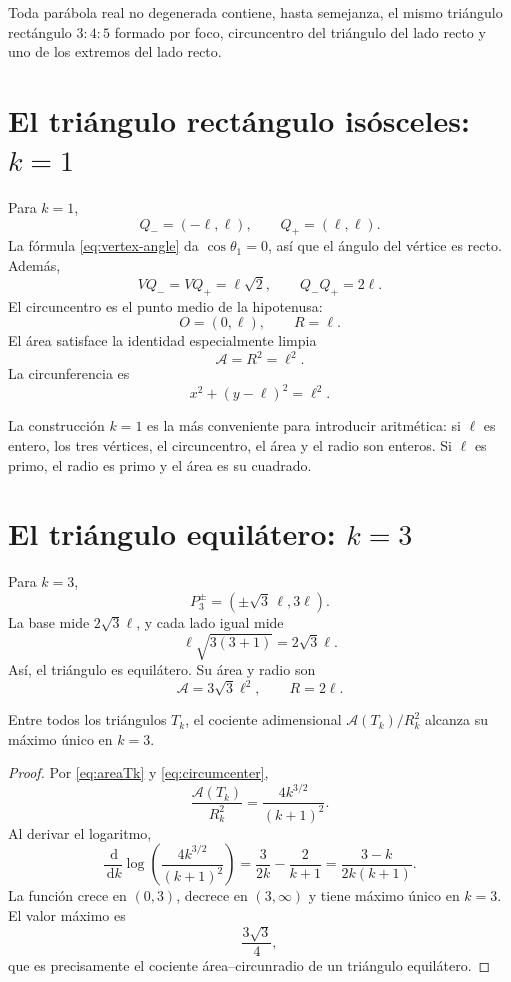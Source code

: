 \documentclass[11pt,a4paper,openany]{report}
\newcommand{\Area}{\mathcal{A}}
\newcommand{\dd}{\,\mathrm{d}}
\begin{document}
\begin{rigorousbox}
Toda parábola real no degenerada contiene, hasta semejanza, el mismo triángulo rectángulo \(3\!:\!4\!:\!5\) formado por foco, circuncentro del triángulo del lado recto y uno de los extremos del lado recto.
\end{rigorousbox}

\section{El triángulo rectángulo isósceles: \(k=1\)}

Para \(k=1\),
\[
 Q_-=(-\ell,\ell),\qquad Q_+=(\ell,\ell).
\]
La fórmula \eqref{eq:vertex-angle} da \(\cos\theta_1=0\), así que el ángulo del vértice es recto. Además,
\[
 VQ_-=VQ_+=\ell\sqrt2,
 \qquad Q_-Q_+=2\ell.
\]
El circuncentro es el punto medio de la hipotenusa:
\[
 O=(0,\ell),\qquad R=\ell.
\]
El área satisface la identidad especialmente limpia
\begin{equation}
 \boxed{\Area=R^2=\ell^2.}
 \label{eq:AequalsR2}
\end{equation}
La circunferencia es
\[
 x^2+(y-\ell)^2=\ell^2.
\]

\begin{insightbox}
La construcción \(k=1\) es la más conveniente para introducir aritmética: si \(\ell\) es entero, los tres vértices, el circuncentro, el área y el radio son enteros. Si \(\ell\) es primo, el radio es primo y el área es su cuadrado.
\end{insightbox}

\section{El triángulo equilátero: \(k=3\)}

Para \(k=3\),
\[
 P_3^\pm=(\pm\sqrt3\,\ell,3\ell).
\]
La base mide \(2\sqrt3\ell\), y cada lado igual mide
\[
 \ell\sqrt{3(3+1)}=2\sqrt3\ell.
\]
Así, el triángulo es equilátero. Su área y radio son
\[
 \Area=3\sqrt3\ell^2,
 \qquad R=2\ell.
\]

\begin{theorem}
Entre todos los triángulos \(T_k\), el cociente adimensional \(\Area(T_k)/R_k^2\) alcanza su máximo único en \(k=3\).
\end{theorem}

\begin{proof}
Por \eqref{eq:areaTk} y \eqref{eq:circumcenter},
\[
 \frac{\Area(T_k)}{R_k^2}
 =\frac{4k^{3/2}}{(k+1)^2}.
\]
Al derivar el logaritmo,
\[
 \frac{\dd}{\dd k}\log\left(\frac{4k^{3/2}}{(k+1)^2}\right)
 =\frac{3}{2k}-\frac{2}{k+1}
 =\frac{3-k}{2k(k+1)}.
\]
La función crece en \((0,3)\), decrece en \((3,\infty)\) y tiene máximo único en \(k=3\). El valor máximo es
\[
 \frac{3\sqrt3}{4},
\]
que es precisamente el cociente área--circunradio de un triángulo equilátero.
\end{proof}
\end{document}
